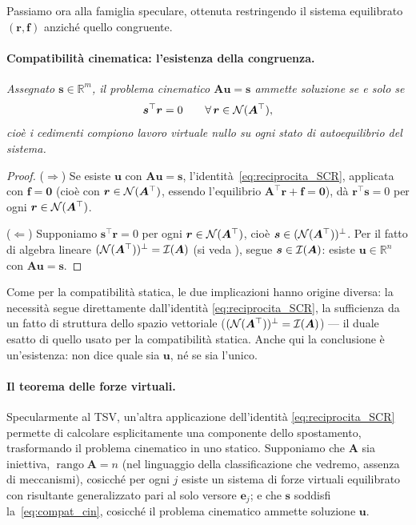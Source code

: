 Passiamo ora alla famiglia speculare, ottenuta restringendo il
sistema equilibrato $(\bm r,\bm f)$ anziché quello congruente.

\paragraph{Compatibilità cinematica: l'esistenza della congruenza.}
	\label{cor:compat_cin}
	
	
\emph{	Assegnato $\bm s\in\mathbb R^m$, il problema cinematico
	$\bm A\bm u=\bm s$ ammette soluzione se e solo se
	\begin{equation}\label{eq:compat_cin}
		\bm s^\top\bm r = 0\qquad\forall\,\bm r\in\mathcal{N}(\bm A^\top),
	\end{equation}
	cioè i cedimenti compiono lavoro virtuale nullo su ogni
	stato di autoequilibrio del sistema.}
	
	\medskip

\begin{proof}
	($\Rightarrow$) Se esiste $\bm u$ con $\bm A\bm u=\bm s$,
	l'identità~\eqref{eq:reciprocita_SCR}, applicata con
	$\bm f=\bm 0$ (cioè con $\bm r\in\mathcal{N}(\bm A^\top)$, essendo
	l'equilibrio $\bm A^\top\bm r+\bm f=\bm 0$), dà
	$\bm r^\top\bm s=0$ per ogni $\bm r\in\mathcal{N}(\bm A^\top)$.
	
	($\Leftarrow$) Supponiamo $\bm s^\top\bm r=0$ per ogni
	$\bm r\in\mathcal{N}(\bm A^\top)$, cioè
	$\bm s\in(\mathcal{N}(\bm A^\top))^\perp$. Per il fatto di algebra
	lineare $(\mathcal{N}(\bm A^\top))^\perp=\mathcal{I}(\bm A)$
	(si veda ), segue
	$\bm s\in\mathcal{I}(\bm A)$: esiste $\bm u\in\mathbb
	R^n$ con $\bm A\bm u=\bm s$.
\end{proof}
\begin{oss}
	Come per la compatibilità statica, le due implicazioni
	hanno origine diversa: la necessità segue direttamente
	dall'identità \eqref{eq:reciprocita_SCR}, la sufficienza da
	un fatto di struttura dello spazio vettoriale
	($(\mathcal{N}(\bm A^\top))^\perp=\mathcal{I}(\bm A)$) --- il
	duale esatto di quello usato per la compatibilità statica.
	Anche qui la conclusione è un'esistenza: non dice quale sia
	$\bm u$, né se sia l'unico.
\end{oss}
\paragraph{Il teorema delle forze virtuali.}	\label{cor:TFV}
Specularmente al TSV, un'altra applicazione dell'identità
\eqref{eq:reciprocita_SCR} permette di calcolare esplicitamente
una componente dello spostamento, trasformando il problema
cinematico in uno statico. Supponiamo che $\bm A$ sia
iniettiva, $\operatorname{rango}\bm A=n$ (nel linguaggio della
classificazione che vedremo, assenza di meccanismi), cosicché
per ogni $j$ esiste un sistema di forze virtuali equilibrato
con risultante generalizzato pari al solo versore $\bm e_j$; e
che $\bm s$ soddisfi la~\eqref{eq:compat_cin}, cosicché il
problema cinematico ammette soluzione $\bm u$.

